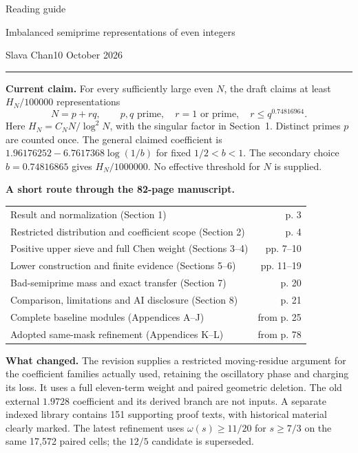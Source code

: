 \documentclass[10pt]{article}
\begin{document}
{\LARGE Reading guide}\par
{\large Imbalanced semiprime representations of even integers}\par
Slava Chan\hfill 10 October 2026
\vspace{3pt}\hrule\vspace{6pt}

\textbf{Current claim.} For every sufficiently large even $N$, the draft claims
at least $H_N/100000$ representations
\[
 N=p+rq,\qquad p,q\text{ prime},\quad r=1\text{ or prime},\quad
 r\le q^{0.74816964}.
\]
Here $H_N=C_NN/\log^2N$, with the singular factor in Section~1.
Distinct primes $p$ are counted once. The general claimed coefficient is
$1.96176252-6.7617368\log(1/b)$ for fixed $1/2<b<1$.
The secondary choice $b=0.74816865$ gives $H_N/1000000$.
No effective threshold for $N$ is supplied.

\textbf{A short route through the 82-page manuscript.}
\begin{center}
\begin{tabular}{@{}p{.70\linewidth}r@{}}
\toprule
Result and normalization (Section 1) & p. 3\\
Restricted distribution and coefficient scope (Section 2) & p. 4\\
Positive upper sieve and full Chen weight (Sections 3--4) & pp. 7--10\\
Lower construction and finite evidence (Sections 5--6) & pp. 11--19\\
Bad-semiprime mass and exact transfer (Section 7) & p. 20\\
Comparison, limitations and AI disclosure (Section 8) & p. 21\\
Complete baseline modules (Appendices A--J) & from p. 25\\
Adopted same-mask refinement (Appendices K--L) & from p. 78\\
\bottomrule
\end{tabular}
\end{center}

\textbf{What changed.} The revision supplies a restricted moving-residue
argument for the coefficient families actually used, retaining the
oscillatory phase and charging its loss. It uses a full eleven-term weight
and paired geometric deletion. The old external $1.9728$ coefficient and
its derived branch are not inputs. A separate indexed library contains
151 supporting proof texts, with historical material clearly marked.
The latest refinement uses $\omega(s)\ge11/20$ for $s\ge7/3$ on the same
17,572 paired cells; the $12/5$ candidate is superseded.
\end{document}
